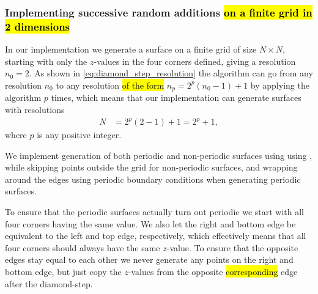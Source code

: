 \subsubsection{Implementing successive random additions \hl{on a finite grid in 2 dimensions}}
In our implementation we generate a surface on a finite grid of size $N\times N$, starting with only the $z$-values in the four corners defined, giving a resolution $n_0 = 2$. As shown in \cref{eq:diamond_step_resolution} the algorithm can go from any resolution $n_0$ to any resolution \hl{of the form} $n_p = 2^p(n_0-1) + 1$ by applying the algorithm $p$ times, which means that our implementation can generate surfaces with resolutions
\begin{align*}
    N &= 2^p(2-1) + 1 = 2^p + 1,
\end{align*}
where $p$ is any positive integer.

We implement generation of both periodic and non-periodic surfaces using using , while skipping points outside the grid for non-periodic surfaces, and wrapping around the edges using periodic boundary conditions when generating periodic surfaces.

To ensure that the periodic surfaces actually turn out periodic we start with all four corners having the same value. We also let the right and bottom edge be equivalent to the left and top edge, respectively, which effectively means that all four corners should always have the same $z$-value. To ensure that the opposite edges stay equal to each other we never generate any points on the right and bottom edge, but just copy the $z$-values from the opposite \hl{corresponding} edge after the diamond-step.

